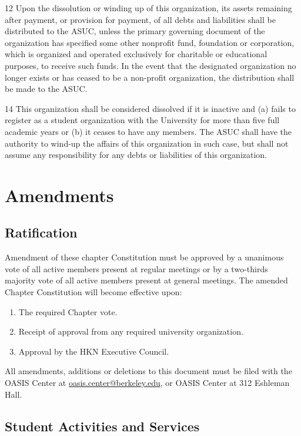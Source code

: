 \documentclass[11pt]{article}
\begin{document}
12 Upon the dissolution or winding up of this organization, its assets remaining after payment, or provision for payment, of all debts and liabilities shall be distributed to the ASUC, unless the primary governing document of the organization has specified some other nonprofit fund, foundation or corporation, which is organized and operated exclusively for charitable or educational purposes, to receive such funds.
In the event that the designated organization no longer exists or has ceased to be a non-profit organization, the distribution shall be made to the ASUC.

14 This organization shall be considered dissolved if it is inactive and (a) fails to register as a student organization with the University for more than five full academic years or (b) it ceases to have any members.
The ASUC shall have the authority to wind-up the affairs of this organization in such case, but shall not assume any responsibility for any debts or liabilities of this organization.
\section{Amendments}
\label{sec:orgdd060f4}

\subsection{Ratification}
\label{sec:org9ea6ce0}

Amendment of these chapter Constitution must be approved by a unanimous vote of all active members present at regular meetings or by a two-thirds majority vote of all active members present at general meetings.
The amended Chapter Constitution will become effective upon:

\begin{enumerate}
\item The required Chapter vote.
\item Receipt of approval from any required university organization.
\item Approval by the HKN Executive Council.
\end{enumerate}

All amendments, additions or deletions to this document must be filed with the OASIS Center at \href{mailto:oasis.center@berkeley.edu}{oasis.center@berkeley.edu}, or OASIS Center at 312 Eshleman Hall.

\subsection{Student Activities and Services}
\label{sec:org7053bc9}
\end{document}
